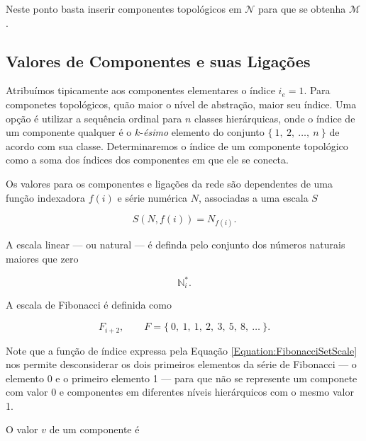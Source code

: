 



Neste ponto basta inserir componentes topológicos em $\mathcal{N}$ para que se
obtenha $\mathcal{M}$.

\subsection{Valores de Componentes e suas Ligações}
\label{subsec:ModelCharacterization}

Atribuímos tipicamente aos componentes elementares o índice $i_e = 1$.
Para componetes topológicos, quão maior o nível de abstração, maior seu índice.
Uma opção é utilizar a sequência ordinal para $n$ classes hierárquicas, onde o
índice de um componente qualquer é o $k$-\textit{ésimo} elemento do conjunto
$\{\ 1,\ 2,\ \dots,\ n\ \}$ de acordo com sua classe.
Determinaremos o índice de um componente topológico como a soma dos índices dos
componentes em que ele se conecta.

Os valores para os componentes e ligações da rede são dependentes de uma função
indexadora $f(i)$ e série numérica $N$, associadas a uma escala $S$

\begin{equation}
	\label{Equation:SetScale}
	S(N, f(i)) = N_{f(i)}.
\end{equation}

A escala linear --- ou natural --- é definda pelo conjunto dos números naturais
maiores que zero

\begin{equation}
	\label{Equation:NaturalSetScale}
	\mathbb{N}_{i}^{*}.
\end{equation}

A escala de Fibonacci é definida como

\begin{equation}
	\label{Equation:FibonacciSetScale}
	F_{i+2}, \qquad F= \{\ 0,\ 1,\ 1,\ 2,\ 3,\ 5,\ 8,\ \dots\ \}.
\end{equation}

Note que a função de índice expressa pela Equação \ref{Equation:FibonacciSetScale}
nos permite desconsiderar os dois primeiros elementos da série de Fibonacci
--- o elemento 0 e o primeiro elemento 1 --- para que não se represente um
componete com valor 0 e componentes em diferentes níveis hierárquicos com o
mesmo valor 1.

O valor $v$ de um componente é

